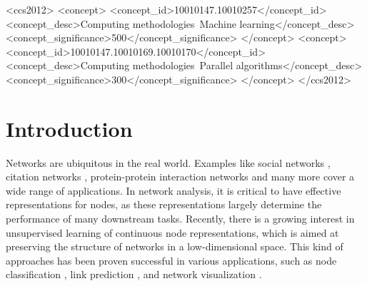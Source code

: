 \documentclass[sigconf]{acmart}
\begin{document}
\begin{CCSXML}
    <ccs2012>
        <concept>
            <concept_id>10010147.10010257</concept_id>
            <concept_desc>Computing methodologies~Machine learning</concept_desc>
            <concept_significance>500</concept_significance>
        </concept>
            <concept>
            <concept_id>10010147.10010169.10010170</concept_id>
            <concept_desc>Computing methodologies~Parallel algorithms</concept_desc>
            <concept_significance>300</concept_significance>
        </concept>
    </ccs2012>
\end{CCSXML}



\maketitle

\section{Introduction}

Networks are ubiquitous in the real world. Examples like social networks \cite{mislove2007measurement}, citation networks \cite{sen2008collective}, protein-protein interaction networks \cite{szklarczyk2016string} and many more cover a wide range of applications. In network analysis, it is critical to have effective representations for nodes, as these representations largely determine the performance of many downstream tasks. Recently, there is a growing interest in unsupervised learning of continuous node representations, which is aimed at preserving the structure of networks in a low-dimensional space. This kind of approaches has been proven successful in various applications, such as node classification \cite{perozzi2014deepwalk}, link prediction \cite{liben2007link}, and network visualization \cite{tang2016visualizing}.
\end{document}
